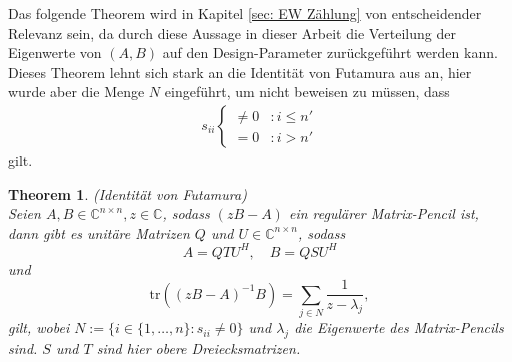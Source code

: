 \documentclass[a4paper,12pt]{report}
\newcommand{\C}{\mathbb C}
\newcommand{\tr}{\text{tr}}
\newcommand{\Cnn}{\C^{n\times n}}
\newcommand{\inv}{^{-1}}
\newcommand{\1}{\mathds{1}}
\theoremstyle{plain} %
\newtheorem{theorem}{Theorem}
\theoremstyle{definition} %
\theoremstyle{remark}
\newtheorem{remark}[theorem]{Bermerkung}
\begin{document}
            Das folgende Theorem wird in Kapitel \ref{sec: EW Zählung} von entscheidender Relevanz sein,
            da durch diese Aussage in dieser Arbeit die Verteilung der Eigenwerte von $(A, B)$ auf den Design-Parameter \s zurückgeführt werden kann.
            Dieses Theorem lehnt sich stark an die Identität von Futamura aus \cite[S. 127]{grundlageFutamura} an, hier wurde aber die Menge $N$ eingeführt, um nicht beweisen zu müssen, 
            dass
            \begin{align*}
                  s_{ii} \begin{cases}
                        \ne 0 & : i\le n'\\
                        = 0 & : i>n'
                  \end{cases}
            \end{align*}
            gilt.

            \begin{theorem}(Identität von Futamura)
                  \label{thrm: IdentitätFutamura}\\
                  Seien $A, B\in\Cnn, z\in \C$, sodass $(zB-A)$ ein regulärer Matrix-Pencil ist, dann gibt es unitäre Matrizen $Q$ und $U \in\Cnn$, sodass
                  $$A = QTU^H,\quad B=QSU^H$$
                  und
                  \begin{equation}
                        \label{eqn: Resultat_Futamura}
                        \tr((zB-A)\inv B) = \sum_{j\in N}\frac{1}{z-\lambda_j},
                  \end{equation}
                  gilt, wobei $N:=\{i\in\{1,\dots,n\}: s_{ii}\ne 0\}$ und $\lambda_j$ die Eigenwerte des Matrix-Pencils sind.
                  $S$ und $T$ sind hier obere Dreiecksmatrizen.
            \end{theorem}

\end{document}
